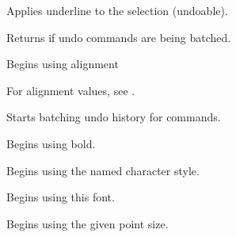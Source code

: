 \label{wxrichtextctrlapplyunderlinetoselection}


Applies underline to the selection (undoable).

\label{wxrichtextctrlbatchingundo}


Returns \true if undo commands are being batched.

\label{wxrichtextctrlbeginalignment}


Begins using alignment

For alignment values, see .

\label{wxrichtextctrlbeginbatchundo}


Starts batching undo history for commands.

\label{wxrichtextctrlbeginbold}


Begins using bold.

\label{wxrichtextctrlbegincharacterstyle}


Begins using the named character style.

\label{wxrichtextctrlbeginfont}


Begins using this font.

\label{wxrichtextctrlbeginfontsize}


Begins using the given point size.

\label{wxrichtextctrlbeginitalic}


